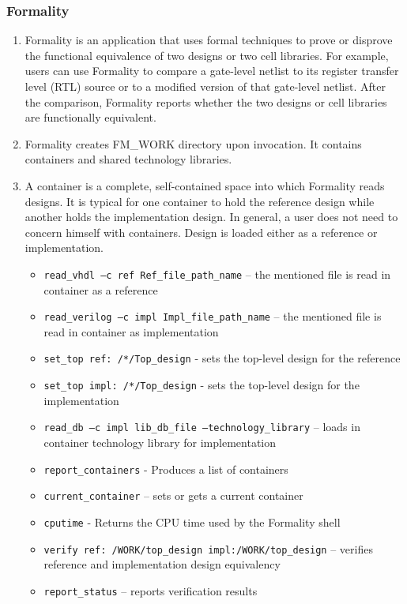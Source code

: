 \documentclass[a4paper,12pt,twoside]{article}
\begin{document}
\subsubsection{Formality}
\begin{enumerate}
    \item Formality is an application that uses formal techniques to prove or disprove the functional equivalence of two designs or two cell libraries. For example, users can use Formality to compare a gate-level netlist to its register transfer level (RTL) source or to a modified version of that gate-level netlist. After the comparison, Formality reports whether the two designs or cell libraries are functionally equivalent.
    \item Formality creates FM\_WORK directory upon invocation. It contains containers and shared technology libraries.
    \item A container is a complete, self-contained space into which Formality reads designs. It is typical for one container to hold the reference design while another holds the implementation design. In general, a user does not need to concern himself with containers. Design is loaded either as a reference or implementation.
    \begin{itemize}
        \item \texttt{read\_vhdl –c ref Ref\_file\_path\_name} – the mentioned file is read in container as a reference
        \item \texttt{read\_verilog –c impl Impl\_file\_path\_name} – the mentioned file is read in container as implementation
        \item \texttt{set\_top ref: /*/Top\_design} - sets the top-level design for the reference
        \item \texttt{set\_top impl: /*/Top\_design} - sets the top-level design for the implementation
        \item \texttt{read\_db –c impl lib\_db\_file –technology\_library} – loads in container technology library for implementation
        \item \texttt{report\_containers} - Produces a list of containers
        \item \texttt{current\_container} – sets or gets a current container
        \item \texttt{cputime} - Returns the CPU time used by the Formality shell
        \item \texttt{verify ref: /WORK/top\_design impl:/WORK/top\_design} – verifies reference and implementation design equivalency
        \item \texttt{report\_status} – reports verification results
    \end{itemize}
\end{enumerate}
\end{document}
